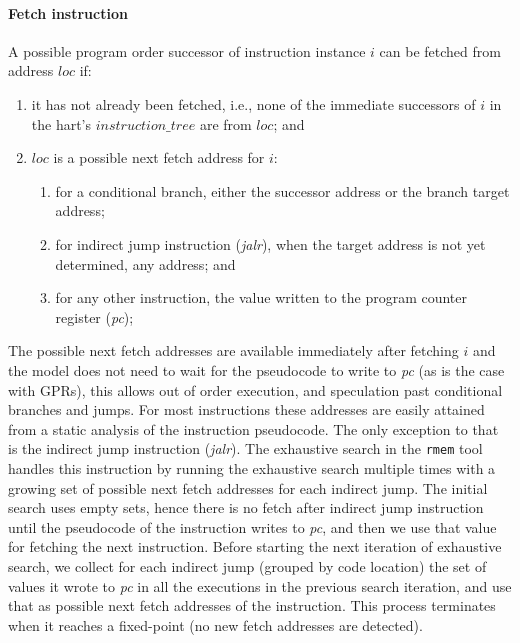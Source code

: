 \paragraph{Fetch instruction}\label{omm:hart:fetch}
A possible program order successor of instruction instance $i$ can be fetched from address $loc$ if:
\begin{enumerate}
\item it has not already been fetched, i.e., none of the immediate successors of $i$ in the hart's $instruction\_tree$ are from $loc$; and
\item $loc$ is a possible next fetch address for $i$:
  \begin{enumerate}
  \item for a conditional branch, either the successor address or the branch target address;
  \item for indirect jump instruction ({\em jalr}), when the target address is not yet determined, any address; and
  \item for any other instruction, the value written to the program counter register ({\em pc});
  \end{enumerate}
\end{enumerate}

\begin{commentary}
The possible next fetch addresses are available immediately after fetching $i$ and the model does not need to wait for the pseudocode to write to {\em pc} (as is the case with GPRs), this allows out of order execution, and speculation past conditional branches and jumps.
For most instructions these addresses are easily attained from a static analysis of the instruction pseudocode.
The only exception to that is the indirect jump instruction ({\em jalr}).
%
The exhaustive search in the {\tt rmem} tool handles this instruction by running the exhaustive search multiple times with a growing set of possible next fetch addresses for each indirect jump.
The initial search uses empty sets, hence there is no fetch after indirect jump instruction until the pseudocode of the instruction writes to {\em pc}, and then we use that value for fetching the next instruction.
Before starting the next iteration of exhaustive search, we collect for each indirect jump (grouped by code location) the set of values it wrote to {\em pc} in all the executions in the previous search iteration, and use that as possible next fetch addresses of the instruction.
This process terminates when it reaches a fixed-point (no new fetch addresses are detected).
\end{commentary}

